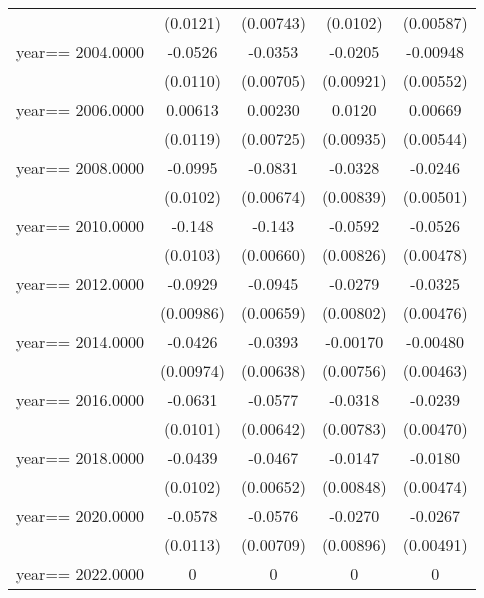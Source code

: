 \begin{table}[htbp]
\begin{tabular}{l*{4}{c}}
                & (0.0121)         &(0.00743)         & (0.0102)         &(0.00587)         \\
year==  2004.0000&  -0.0526\sym{***}&  -0.0353\sym{***}&  -0.0205\sym{**} & -0.00948\sym{*}  \\
                & (0.0110)         &(0.00705)         &(0.00921)         &(0.00552)         \\
year==  2006.0000&  0.00613         &  0.00230         &   0.0120         &  0.00669         \\
                & (0.0119)         &(0.00725)         &(0.00935)         &(0.00544)         \\
year==  2008.0000&  -0.0995\sym{***}&  -0.0831\sym{***}&  -0.0328\sym{***}&  -0.0246\sym{***}\\
                & (0.0102)         &(0.00674)         &(0.00839)         &(0.00501)         \\
year==  2010.0000&   -0.148\sym{***}&   -0.143\sym{***}&  -0.0592\sym{***}&  -0.0526\sym{***}\\
                & (0.0103)         &(0.00660)         &(0.00826)         &(0.00478)         \\
year==  2012.0000&  -0.0929\sym{***}&  -0.0945\sym{***}&  -0.0279\sym{***}&  -0.0325\sym{***}\\
                &(0.00986)         &(0.00659)         &(0.00802)         &(0.00476)         \\
year==  2014.0000&  -0.0426\sym{***}&  -0.0393\sym{***}& -0.00170         & -0.00480         \\
                &(0.00974)         &(0.00638)         &(0.00756)         &(0.00463)         \\
year==  2016.0000&  -0.0631\sym{***}&  -0.0577\sym{***}&  -0.0318\sym{***}&  -0.0239\sym{***}\\
                & (0.0101)         &(0.00642)         &(0.00783)         &(0.00470)         \\
year==  2018.0000&  -0.0439\sym{***}&  -0.0467\sym{***}&  -0.0147\sym{*}  &  -0.0180\sym{***}\\
                & (0.0102)         &(0.00652)         &(0.00848)         &(0.00474)         \\
year==  2020.0000&  -0.0578\sym{***}&  -0.0576\sym{***}&  -0.0270\sym{***}&  -0.0267\sym{***}\\
                & (0.0113)         &(0.00709)         &(0.00896)         &(0.00491)         \\
year==  2022.0000&        0         &        0         &        0         &        0         \\

\end{tabular}
\end{table}
